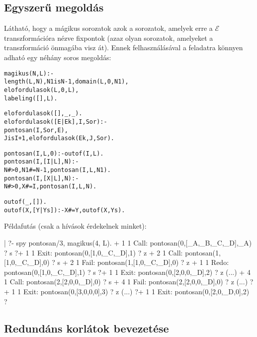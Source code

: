 \subsection{Egyszerű \clpfd megoldás}

Látható, hogy a mágikus sorozatok azok a sorozatok, amelyek erre a $\mathcal{E}$
transzformációra nézve fixpontok (azaz olyan sorozatok, amelyeket a transzformáció
önmagába visz át). Ennek felhasználásával a feladatra könnyen adható egy néhány
soros \clpfd megoldás:

\begin{alltt}
% Az L lista egy N hosszúságú mágikus sorozat.
magikus(N, L) :-
        length(L, N), N1 is N-1, domain(L, 0, N1),
        elofordulasok(L, 0, L),
        labeling([], L).             % most felesleges

% elofordulasok([E\(_\cd{i}\), E\(_\cd{i+1}\), \ldots], i, Sor): Sor-ban az i
% szám E\(_\cd{i}\)-szer, az i+1 szám E\(_\cd{i+1}\)-szer stb. fordul elő.
% Ez a predikátum valósítja meg a fenti előfordulás-sorozat transzformációt
elofordulasok([], _, _).
elofordulasok([E|Ek], I, Sor) :-
        pontosan(I, Sor, E),
        J is I+1, elofordulasok(Ek, J, Sor).

% pontosan(I, L, E): Az I szám L-ben E-szer fordul elő.
pontosan(I, L, 0) :- outof(I, L).
pontosan(I, [I|L], N) :-
        N #> 0, N1 #= N-1, pontosan(I, L, N1).
pontosan(I, [X|L], N) :-
        N #> 0, X #\bs= I, pontosan(I, L, N).

% outof(I, L): Az I szám L-ben nem fordul elő.
outof(_, []).
outof(X, [Y|Ys]) :- X #\bs= Y, outof(X, Ys).
\end{alltt}

Példafutás (csak a  hívások érdekelnek minket):

\begin{prologcode}
| ?- spy pontosan/3, magikus(4, L).
 +      1      1 Call: pontosan(0,[_A,_B,_C,_D],_A) ? s
?+      1      1 Exit: pontosan(0,[1,0,_C,_D],1) ? z
 +      2      1 Call: pontosan(1,[1,0,_C,_D],0) ? s
 +      2      1 Fail: pontosan(1,[1,0,_C,_D],0) ? z
 +      1      1 Redo: pontosan(0,[1,0,_C,_D],1) ? s
?+      1      1 Exit: pontosan(0,[2,0,0,_D],2) ? z
(...)
 +      4      1 Call: pontosan(2,[2,0,0,_D],0) ? s
 +      4      1 Fail: pontosan(2,[2,0,0,_D],0) ? z
(...)
?+      1      1 Exit: pontosan(0,[3,0,0,0],3) ? z
(...)
?+      1      1 Exit: pontosan(0,[2,0,_D,0],2) ?
\end{prologcode}

\subsection{Redundáns korlátok bevezetése}


